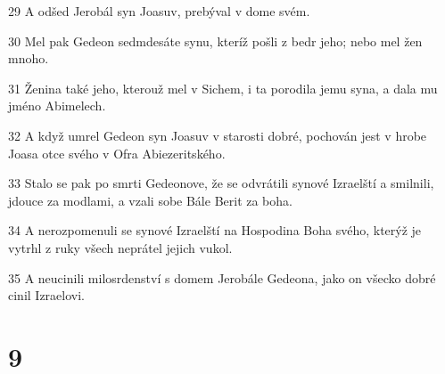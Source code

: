 \par 29 A odšed Jerobál syn Joasuv, prebýval v dome svém.
\par 30 Mel pak Gedeon sedmdesáte synu, kteríž pošli z bedr jeho; nebo mel žen mnoho.
\par 31 Ženina také jeho, kterouž mel v Sichem, i ta porodila jemu syna, a dala mu jméno Abimelech.
\par 32 A když umrel Gedeon syn Joasuv v starosti dobré, pochován jest v hrobe Joasa otce svého v Ofra Abiezeritského.
\par 33 Stalo se pak po smrti Gedeonove, že se odvrátili synové Izraelští a smilnili, jdouce za modlami, a vzali sobe Bále Berit za boha.
\par 34 A nerozpomenuli se synové Izraelští na Hospodina Boha svého, kterýž je vytrhl z ruky všech neprátel jejich vukol.
\par 35 A neucinili milosrdenství s domem Jerobále Gedeona, jako on všecko dobré cinil Izraelovi.

\chapter{9}

